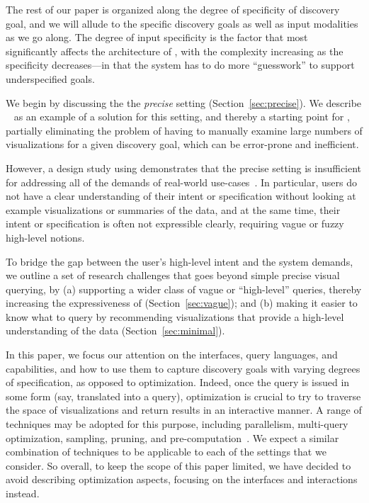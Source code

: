 \par
{}
The rest of our paper is organized along the degree of specificity
of discovery goal, and we will allude to the specific discovery
goals as well as input modalities as we go along. 
The degree of input specificity is the factor
that most significantly affects the architecture of \vida,
with the complexity increasing as the specificity decreases---in that
the system has to do more ``guesswork'' to support underspecified goals. 


\par We begin by discussing the 
the {\em precise} setting (Section~\ref{sec:precise}).
We describe \zv~\cite{Siddiqui2016} 
as an example of a solution for
this setting, and thereby a starting point for \vida,
partially eliminating the problem
of having to manually examine large numbers 
of visualizations for a given discovery goal, 
which can be error-prone and inefficient.




\par However, a design study using \zv demonstrates
that the precise setting is insufficient for
addressing all of the demands of real-world use-cases~\cite{Lee2017}.
In particular, users do not have
a clear understanding of their intent or specification 
without looking
at example visualizations or summaries of the data,
and at the same time, their intent or specification is
often not expressible clearly, requiring 
vague or fuzzy high-level notions.

To bridge the gap between the user's high-level
intent and the system demands,
we outline a set of research challenges
that goes beyond simple precise visual querying, by
(a) supporting a wider class of vague or ``high-level''
queries, thereby increasing the expressiveness
of \vida (Section~\ref{sec:vague});
and 
(b) making it easier to know what to query
by recommending visualizations that provide
a high-level understanding of the data (Section~\ref{sec:minimal}).

In this paper, we focus our attention on the interfaces,
query languages, and capabilities, 
and how to use them to capture discovery goals
with varying degrees of specification, as opposed to optimization.
Indeed, once the query is issued in some form 
(say, translated into a \vidaql
query),
optimization is crucial to try to traverse the space 
of visualizations and return results in an interactive manner.
A range of techniques may be adopted for this purpose,
including parallelism, multi-query optimization, sampling,
pruning, and pre-computation~\cite{Vartak2015,Siddiqui2016}.
We expect a similar combination of techniques to be applicable to
each of the settings that we consider.
So overall, to keep the scope of this paper limited, we have
decided to avoid describing optimization aspects, 
focusing on the interfaces and interactions instead.


